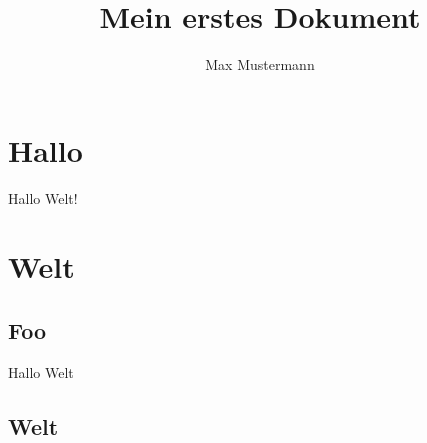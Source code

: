 \documentclass[12pt,ngerman]{scrartcl}
\author{Max Mustermann}
\title{Mein erstes Dokument}
\begin{document}
\maketitle

\tableofcontents


\section{Hallo}

Hallo Welt!

\section{Welt}
\subsection{Foo}

Hallo Welt

\subsection{Welt}
\end{document}
